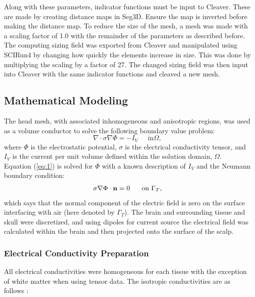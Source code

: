  Along with these parameters, indicator functions must be input to Cleaver. These are made by creating distance maps in Seg3D. Ensure the map is inverted before making the distance map. To reduce the size of the mesh, a mesh was made with a scaling factor of 1.0 with the remainder of the parameters as described before. The computing sizing field was exported from Cleaver and manipulated using SCIRun4 by changing how quickly the elements increase in size. This was done by multiplying the scaling by a factor of 27. The changed sizing field was then input into Cleaver with the same indicator functions and cleaved a new mesh.

\subsection{Mathematical Modeling}
\label{sec:math}


The head mesh, with associated inhomogeneous and anisotropic regions, was used as a volume conductor to solve the following boundary value problem:
%
\begin{equation}
\label{eq:1} \nabla\cdot\sigma\nabla\Phi = -I_{V} \;\;\;\;\mbox{ in
}\Omega,
\end{equation} 
%
where $\Phi$ is the electrostatic potential, $\sigma$ is the electrical conductivity tensor, and $I_{V}$ is the current per unit volume defined within the solution domain, $\Omega$. Equation (\ref{eq:1}) is solved for $\Phi$ with a known description of $I_{V}$ and the Neumann boundary condition:
%
\begin{equation} \sigma\nabla\Phi\cdot{\bf
n} = 0\;\;\;\;\;\mbox{ on }\Gamma_{T}, 
\end{equation} 
%
which says that the normal component of the electric field is zero on the surface interfacing with air (here denoted by $\Gamma_{T}$). The brain and surrounding tissue and skull were discretized, and using dipoles for current source the electrical field was calculated within the brain and then projected onto the surface of the scalp. \cite{ref:math}

\subsubsection{Electrical Conductivity Preparation}
\label{sec:cond}

All electrical conductivities were homogeneous for each tissue with the exception of white matter when using tensor data. The isotropic conductivities are as follows \cite{ref:cond}: 

